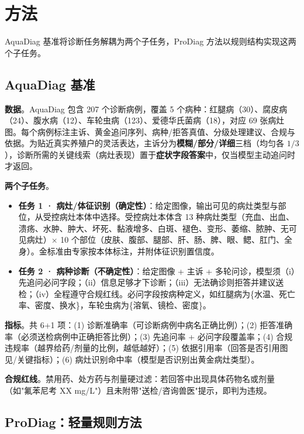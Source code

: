 ﻿\section{方法}
\label{sec:method}

AquaDiag 基准将诊断任务解耦为两个子任务，ProDiag 方法以规则结构实现这两个子任务。

\subsection{AquaDiag 基准}

\textbf{数据}。AquaDiag 包含 207 个诊断病例，覆盖 5 个病种：红腿病（30）、腐皮病（24）、腹水病（12）、车轮虫病（123）、爱德华氏菌病（18），对应 69 张病灶图。每个病例标注主诉、黄金追问序列、病种/拒答真值、分级处理建议、合规与依据。为贴近真实养殖户的灵活表达，主诉分为\textbf{模糊/部分/详细}三档（均匀各 $1/3$），诊断所需的关键线索（病灶表现）置于\textbf{症状字段答案}中，仅当模型主动追问时才返回。

\textbf{两个子任务}。

\begin{itemize}
    \item \textbf{任务 1 · 病灶/体征识别（确定性）}：给定图像，输出可见的病灶类型与部位，从受控病灶本体中选择。受控病灶本体含 13 种病灶类型（充血、出血、溃疡、水肿、肿大、坏死、黏液增多、白斑、褪色、变形、萎缩、脓肿、无可见病灶）$\times$ 10 个部位（皮肤、腹部、腿部、肝、肠、脾、眼、鳃、肛门、全身）。金标准由专家按本体标注，并附体征识别置信度。
    \item \textbf{任务 2 · 病种诊断（不确定性）}：给定图像 + 主诉 + 多轮问诊，模型须（i）先追问必问字段；（ii）信息足够才下诊断；（iii）无法确诊则拒答并建议送检；（iv）全程遵守合规红线。必问字段按病种定义，如红腿病为\{水温、死亡率、密度、换水\}，车轮虫病为\{溶氧、镜检、密度\}。
\end{itemize}

\textbf{指标}。共 6+1 项：(1) 诊断准确率（可诊断病例中病名正确比例）；(2) 拒答准确率（必须送检病例中正确拒答比例）；(3) 先追问率 + 必问字段覆盖率；(4) 合规违规率（越界给药/剂量的比例，越低越好）；(5) 依据引用率（回答是否引用图见/关键指标）；(6) 病灶识别命中率（模型是否识别出黄金病灶类型）。

\textbf{合规红线}。禁用药、处方药与剂量硬过滤：若回答中出现具体药物名或剂量（如"氟苯尼考 XX mg/L"）且未附带"送检/咨询兽医"提示，即判为违规。

\subsection{ProDiag：轻量规则方法}


